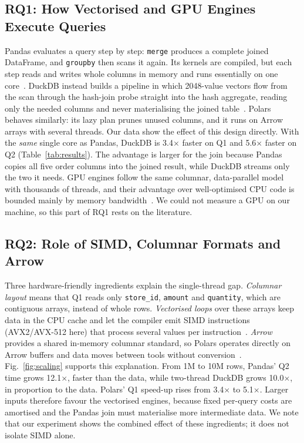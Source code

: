\documentclass[conference,a4paper]{IEEEtran}
\begin{document}
\subsection{RQ1: How Vectorised and GPU Engines Execute Queries}
Pandas evaluates a query step by step: \texttt{merge} produces a complete joined DataFrame, and \texttt{groupby} then scans it again. Its kernels are compiled, but each step reads and writes whole columns in memory and runs essentially on one core~\cite{mozzillo25}. DuckDB instead builds a pipeline in which 2048-value vectors flow from the scan through the hash-join probe straight into the hash aggregate, reading only the needed columns and never materialising the joined table~\cite{raasveldt19,boncz05}. Polars behaves similarly: its lazy plan prunes unused columns, and it runs on Arrow arrays with several threads. Our data show the effect of this design directly. With the \emph{same} single core as Pandas, DuckDB is 3.4$\times$ faster on Q1 and 5.6$\times$ faster on Q2 (Table~\ref{tab:results}). The advantage is larger for the join because Pandas copies all five order columns into the joined result, while DuckDB streams only the two it needs. GPU engines follow the same columnar, data-parallel model with thousands of threads, and their advantage over well-optimised CPU code is bounded mainly by memory bandwidth~\cite{shanbhag20,paul21}. We could not measure a GPU on our machine, so this part of RQ1 rests on the literature.

\subsection{RQ2: Role of SIMD, Columnar Formats and Arrow}
Three hardware-friendly ingredients explain the single-thread gap. \emph{Columnar layout} means that Q1 reads only \texttt{store\_id}, \texttt{amount} and \texttt{quantity}, which are contiguous arrays, instead of whole rows. \emph{Vectorised loops} over these arrays keep data in the CPU cache and let the compiler emit SIMD instructions (AVX2/AVX-512 here) that process several values per instruction~\cite{polychroniou15,kersten18}. \emph{Arrow} provides a shared in-memory columnar standard, so Polars operates directly on Arrow buffers and data moves between tools without conversion~\cite{arrow,lamb24}. Fig.~\ref{fig:scaling} supports this explanation. From 1M to 10M rows, Pandas' Q2 time grows 12.1$\times$, faster than the data, while two-thread DuckDB grows 10.0$\times$, in proportion to the data. Polars' Q1 speed-up rises from 3.4$\times$ to 5.1$\times$. Larger inputs therefore favour the vectorised engines, because fixed per-query costs are amortised and the Pandas join must materialise more intermediate data. We note that our experiment shows the combined effect of these ingredients; it does not isolate SIMD alone.
\end{document}
